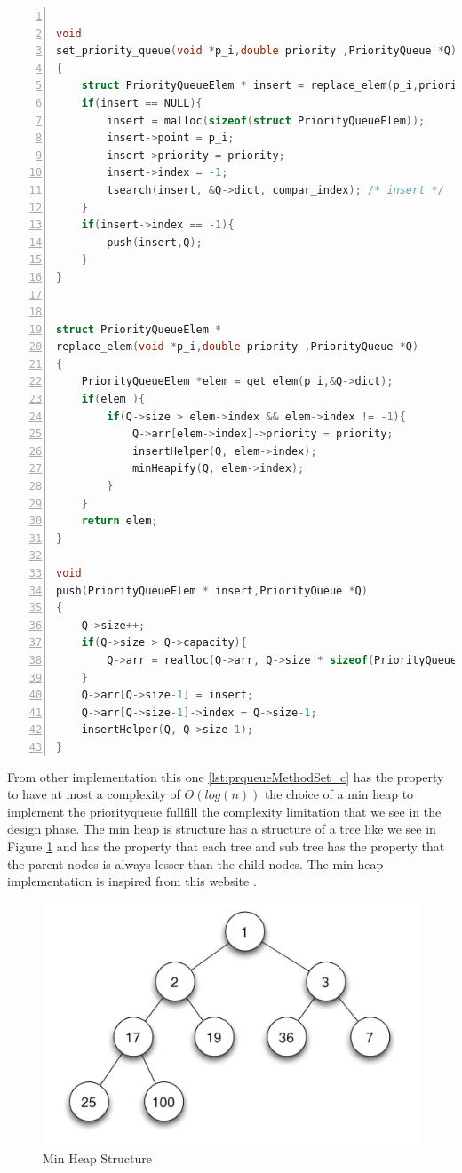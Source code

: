 \begin{lstlisting}[float=h,language=C, % Spécifie le langage du code
caption={PriorityQueue Set Elem}, % Légende du listing
label=lst:prqueueMethodSet_c, % Étiquette pour référencer le listing
numbers=left,
numberstyle=\tiny\color{gray},
stepnumber=1,
frame=single,
breaklines=true,
postbreak=\mbox{\textcolor{red}{$\hookrightarrow$}\space},
showstringspaces=false
]

void
set_priority_queue(void *p_i,double priority ,PriorityQueue *Q)
{
	struct PriorityQueueElem * insert = replace_elem(p_i,priority,Q);
	if(insert == NULL){
		insert = malloc(sizeof(struct PriorityQueueElem));
		insert->point = p_i;
		insert->priority = priority;
		insert->index = -1;
		tsearch(insert, &Q->dict, compar_index); /* insert */
	}
	if(insert->index == -1){
		push(insert,Q);
	}
}


struct PriorityQueueElem *
replace_elem(void *p_i,double priority ,PriorityQueue *Q)
{
	PriorityQueueElem *elem = get_elem(p_i,&Q->dict);
	if(elem ){
		if(Q->size > elem->index && elem->index != -1){
			Q->arr[elem->index]->priority = priority;
			insertHelper(Q, elem->index);
			minHeapify(Q, elem->index);
		}
	}
	return elem;
}
	
void
push(PriorityQueueElem * insert,PriorityQueue *Q)
{
	Q->size++;
	if(Q->size > Q->capacity){
		Q->arr = realloc(Q->arr, Q->size * sizeof(PriorityQueueElem*));
	}
	Q->arr[Q->size-1] = insert;
	Q->arr[Q->size-1]->index = Q->size-1;
	insertHelper(Q, Q->size-1);
}

\end{lstlisting}

From other implementation this one \ref{lst:prqueueMethodSet_c} has the property to have at most a complexity of $O(log(n))$ the choice of a min heap to implement the priorityqueue fullfill the complexity limitation that we see in the design phase. The min heap is structure has a structure of a tree like we see in Figure \ref{fig:min_heap} and has the property that each tree and sub tree has the property that the parent nodes is always lesser than the child nodes. The min heap implementation is inspired from this website \cite{GfG_2023}. 


\begin{figure}[!h]
\centering
\includegraphics[width=1\linewidth]{figures/tree.jpeg}
\caption{Min Heap Structure}
\label{fig:min_heap}
\end{figure}


